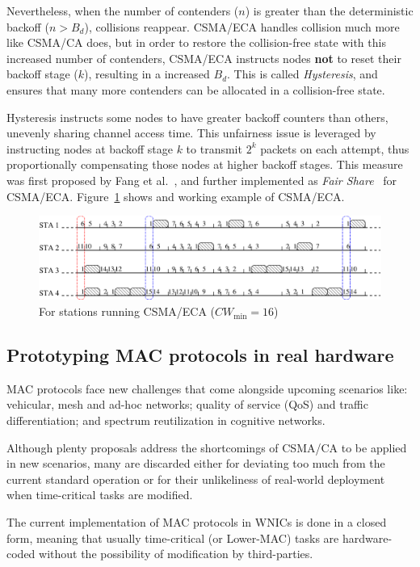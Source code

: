 Nevertheless, when the number of contenders ($n$) is greater than the deterministic backoff ($n>B_{d}$), collisions reappear. CSMA/ECA handles collision much more like CSMA/CA does, but in order to restore the collision-free state with this increased number of contenders, CSMA/ECA instructs nodes {\bfseries not} to reset their backoff stage ($k$), resulting in a increased $B_{d}$. This is called \emph{Hysteresis}, and ensures that many more contenders can be allocated in a collision-free state.

Hysteresis instructs some nodes to have greater backoff counters than others, unevenly sharing channel access time. This unfairness issue is leveraged by instructing nodes at backoff stage $k$ to transmit $2^{k}$ packets on each attempt, thus proportionally compensating those nodes at higher backoff stages. This measure was first proposed by Fang et al.~\cite{L_MAC2}, and further implemented as \emph{Fair Share}~\cite{research2standards} for CSMA/ECA. Figure~\ref{fig:csmaECA} shows and working example of CSMA/ECA.

\begin{figure}[htbp]
  \centering
  \includegraphics[width=\linewidth]{csma_eca_different_backoff_short.eps}
  \caption{For stations running CSMA/ECA ($CW_{\min}=16$)
  \label{fig:csmaECA}}
\end{figure}

\subsection{Prototyping MAC protocols in real hardware}
MAC protocols face new challenges that come alongside upcoming scenarios like: vehicular, mesh and ad-hoc networks; quality of service (QoS) and traffic differentiation; and spectrum reutilization in cognitive networks. 

Although plenty proposals address the shortcomings of CSMA/CA to be applied in new scenarios, many are discarded either for deviating too much from the current standard operation or for their unlikeliness of real-world deployment when time-critical tasks are modified.

The current implementation of MAC protocols in WNICs is done in a closed form, meaning that usually time-critical (or Lower-MAC) tasks are hardware-coded without the possibility of modification by third-parties.

